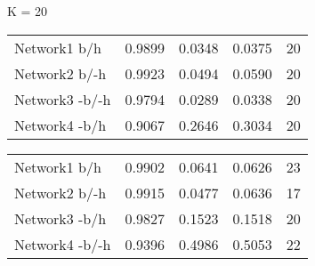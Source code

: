 \begin{table*}[h]

	\begin{minipage}[h]{0.45\linewidth} 
K = 20
\begin{tabular}{lrrrr}

 Network1 b/h          &   0.9899 &      0.0348 &   0.0375 & 20 \\
 Network2 b/-h       &   0.9923 &      0.0494 &   0.0590 & 20 \\
 Network3 -b/-h      &   0.9794 &      0.0289 &   0.0338 & 20 \\
 Network4 -b/h        &   0.9067 &      0.2646 &   0.3034 & 20 \\
\hline
\end{tabular}
\end{minipage}
\hspace{0.8cm}
\begin{minipage}[h]{0.45\linewidth}
\begin{tabular}{lrrrr}
Network1 b/h       &   0.9902 &      0.0641 &   0.0626 &  23 \\
Network2 b/-h     &   0.9915 &      0.0477 &   0.0636 & 17 \\
Network3 -b/h     &   0.9827 &      0.1523 &   0.1518 &  20 \\
Network4 -b/-h     &   0.9396 &      0.4986 &   0.5053 &  22 \\
\hline
\end{tabular}
\end{minipage}
\end{table*}






